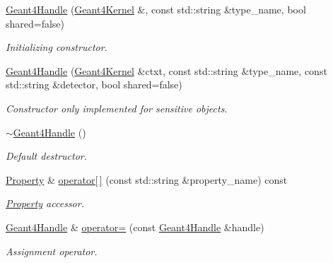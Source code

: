 \begin{DoxyCompactItemize}
\hyperlink{class_d_d4hep_1_1_simulation_1_1_geant4_handle_ae506e6b636fc035905011c9e5a9012ab}{Geant4Handle} (\hyperlink{class_d_d4hep_1_1_simulation_1_1_geant4_kernel}{Geant4Kernel} \&, const std::string \&type\_\-name, bool shared=false)
\begin{DoxyCompactList}\small\item\em Initializing constructor. \item\end{DoxyCompactList}\item 
\hyperlink{class_d_d4hep_1_1_simulation_1_1_geant4_handle_a8a80a9a11de03a890561185f4e45ba18}{Geant4Handle} (\hyperlink{class_d_d4hep_1_1_simulation_1_1_geant4_kernel}{Geant4Kernel} \&ctxt, const std::string \&type\_\-name, const std::string \&detector, bool shared=false)
\begin{DoxyCompactList}\small\item\em Constructor only implemented for sensitive objects. \item\end{DoxyCompactList}\item 
\hyperlink{class_d_d4hep_1_1_simulation_1_1_geant4_handle_adfcf2edb6e30d0780f2a20a8be6f47b5}{$\sim$Geant4Handle} ()
\begin{DoxyCompactList}\small\item\em Default destructor. \item\end{DoxyCompactList}\item 
\hyperlink{class_d_d4hep_1_1_property}{Property} \& \hyperlink{class_d_d4hep_1_1_simulation_1_1_geant4_handle_a78e5e4da024f3da91e677898576d1180}{operator\mbox{[}$\,$\mbox{]}} (const std::string \&property\_\-name) const 
\begin{DoxyCompactList}\small\item\em \hyperlink{class_d_d4hep_1_1_property}{Property} accessor. \item\end{DoxyCompactList}\item 
\hyperlink{class_d_d4hep_1_1_simulation_1_1_geant4_handle}{Geant4Handle} \& \hyperlink{class_d_d4hep_1_1_simulation_1_1_geant4_handle_a92e5bb66d347989002bc13a328502e04}{operator=} (const \hyperlink{class_d_d4hep_1_1_simulation_1_1_geant4_handle}{Geant4Handle} \&handle)
\begin{DoxyCompactList}\small\item\em Assignment operator. \item\end{DoxyCompactList}\item 

\end{DoxyCompactItemize}
